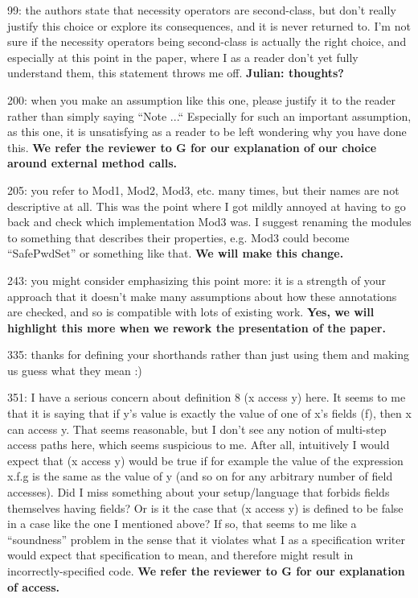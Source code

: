 \documentclass[11pt]{amsart}
\newcommand{\us}[1]{\bf #1}
\begin{document}
99: the authors state that necessity operators are second-class, but don’t really justify this choice or explore its consequences, and it is never returned to. I’m not sure if the necessity operators being second-class is actually the right choice, and especially at this point in the paper, where I as a reader don’t yet fully understand them, this statement throws me off.
{\us{Julian: thoughts?}}

200: when you make an assumption like this one, please justify it to the reader rather than simply saying “Note ...“ Especially for such an important assumption, as this one, it is unsatisfying as a reader to be left wondering why you have done this.
{\us{We refer the reviewer to G for our explanation of our choice around external method calls.}}

205: you refer to Mod1, Mod2, Mod3, etc. many times, but their names are not descriptive at all. This was the point where I got mildly annoyed at having to go back and check which implementation Mod3 was. I suggest renaming the modules to something that describes their properties, e.g. Mod3 could become “SafePwdSet” or something like that.
{\us{We will make this change.}}

243: you might consider emphasizing this point more: it is a strength of your approach that it doesn’t make many assumptions about how these annotations are checked, and so is compatible with lots of existing work.
{\us{Yes, we will highlight this more when we rework the presentation of the paper.}}

335: thanks for defining your shorthands rather than just using them and making us guess what they mean :)

351: I have a serious concern about definition 8 (x access y) here. It seems to me that it is saying that if y’s value is exactly the value of one of x’s fields (f), then x can access y. That seems reasonable, but I don’t see any notion of multi-step access paths here, which seems suspicious to me. After all, intuitively I would expect that (x access y) would be true if for example the value of the expression x.f.g is the same as the value of y (and so on for any arbitrary number of field accesses). Did I miss something about your setup/language that forbids fields themselves having fields? Or is it the case that (x access y) is defined to be false in a case like the one I mentioned above? If so, that seems to me like a “soundness” problem in the sense that it violates what I as a specification writer would expect that specification to mean, and therefore might result in incorrectly-specified code.
{\us{We refer the reviewer to G for our explanation of access.}}
\end{document}
